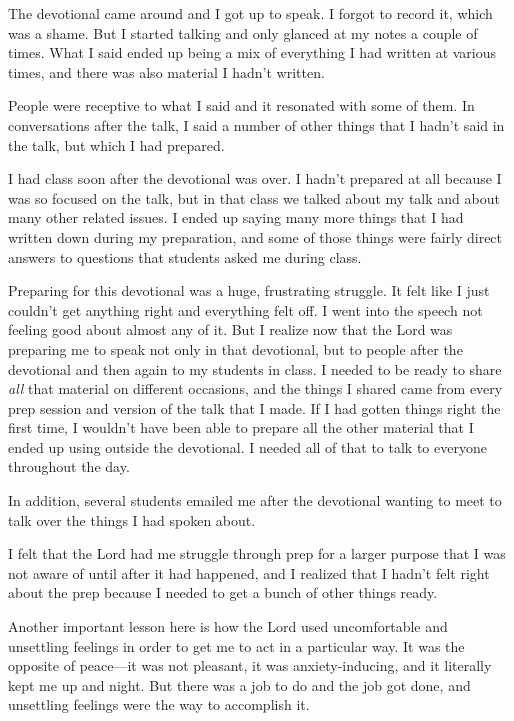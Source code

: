 		The devotional came around and I got up to speak. I forgot to record it, which was a shame. But I started talking and only glanced at my notes a couple of times. What I said ended up being a mix of everything I had written at various times, and there was also material I hadn't written.
		
		People were receptive to what I said and it resonated with some of them. In conversations after the talk, I said a number of other things that I hadn't said in the talk, but which I had prepared.
		
		I had class soon after the devotional was over. I hadn't prepared at all because I was so focused on the talk, but in that class we talked about my talk and about many other related issues. I ended up saying many more things that I had written down during my preparation, and some of those things were fairly direct answers to questions that students asked me during class.
		
		Preparing for this devotional was a huge, frustrating struggle. It felt like I just couldn't get anything right and everything felt off. I went into the speech not feeling good about almost any of it. But I realize now that the Lord was preparing me to speak not only in that devotional, but to people after the devotional and then again to my students in class. I needed to be ready to share \textit{all} that material on different occasions, and the things I shared came from every prep session and version of the talk that I made. If I had gotten things right the first time, I wouldn't have been able to prepare all the other material that I ended up using outside the devotional. I needed all of that to talk to everyone throughout the day.
		
		In addition, several students emailed me after the devotional wanting to meet to talk over the things I had spoken about. 
		
		I felt that the Lord had me struggle through prep for a larger purpose that I was not aware of until after it had happened, and I realized that I hadn't felt right about the prep because I needed to get a bunch of other things ready.
		
		Another important lesson here is how the Lord used uncomfortable and unsettling feelings in order to get me to act in a particular way. It was the opposite of peace---it was not pleasant, it was anxiety-inducing, and it literally kept me up and night. But there was a job to do and the job got done, and unsettling feelings were the way to accomplish it.
		
